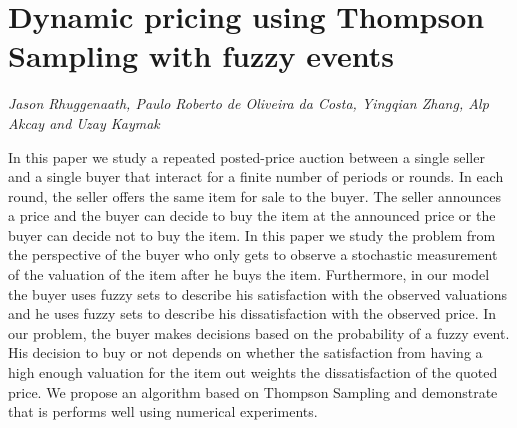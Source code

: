 \documentclass[../booklet.tex]{subfiles}
\begin{document}
\section[Dynamic pricing using Thompson Sampling with fuzzy events. {\it Jason Rhuggenaath, Paulo Roberto de Oliveira da Costa, Yingqian Zhang, Alp Akcay and Uzay Kaymak}]{Dynamic pricing using Thompson Sampling with fuzzy events}
    

\begin{center}
  {\it Jason Rhuggenaath, Paulo Roberto de Oliveira da Costa, Yingqian Zhang, Alp Akcay and Uzay Kaymak}
\end{center}

\vskip 0.8cm


In this paper we study  a repeated posted-price auction between a single seller and a single buyer that interact for a finite number of periods or rounds. In each round, the seller offers the same item for sale to the buyer. The seller announces a price and the buyer can decide to buy the item at the announced price or the buyer can decide not to buy the item. In this paper we study the problem from the perspective of the buyer who only gets to observe a stochastic measurement of the valuation of the item after he buys the item. Furthermore, in our model the buyer uses fuzzy sets to describe his satisfaction with the observed valuations and he uses fuzzy sets to describe his dissatisfaction with the observed price. In our problem, the buyer makes decisions based on the probability of a fuzzy event. His decision to buy or not depends on whether the satisfaction from having a high enough valuation for the item out weights the dissatisfaction of the quoted price.  We propose an algorithm based on Thompson Sampling and demonstrate that is performs well using numerical experiments. 
\end{document}
